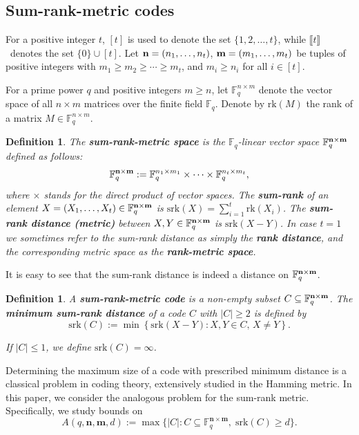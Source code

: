 \documentclass[a4paper]{article}
\newtheorem{definition}[formula]{Definition}
\newcommand{\F}{\mathbb{F}}
\newcommand{\MatnmFq}{\spac}
\newcommand{\bfn}{\mathbf {n}}
\newcommand{\bfm}{\mathbf {m}}
\newcommand{\spac}{\F^{\bfn\times\bfm}_q}
\newcommand{\srk}{\mathrm{srk}}
\newcommand{\rk}{\mathrm{rk}}
\newcommand{\db}[1]{\llbracket #1 \rrbracket}
\begin{document}
\subsection{Sum-rank-metric codes}

For a positive integer $t$, $[t]$ is used to denote the set $\{1,2,\dots,t\}$, while $\db{t}$~denotes the set $\{0\}\cup[t]$. Let ${\bf n}=(n_1,\ldots,n_t)$, ${\bf m}=(m_1,\ldots,m_t)$ be tuples of positive integers 
with $m_1 \geq m_2 \geq \cdots \geq m_t$, 
and $m_i\geq n_i$ for all $i\in [t]$.

For a prime power $q$ and 
positive integers $m\geq n$, 
let $\mathbb{F}_q^{n\times m}$
denote the vector space of all $n\times m$ matrices over the finite field $\mathbb{F}_q$. 
Denote by $\rk(M)$ the rank of a matrix 
$M\in \mathbb{F}_q^{n\times m}$.
 
 
 \begin{definition}\label{def:srk}
The \emph{\textbf{sum-rank-metric space}} is 
the $\mathbb{F}_q$-linear vector space 
$\mathbb{F}_q^{{\bf n}\times {\bf m}}$ defined as follows:
\[
\mathbb{F}_q^{{\bf n}\times {\bf m}}:=
\mathbb{F}_q^{n_1\times m_1}\times \cdots \times
\mathbb{F}_q^{n_t\times m_t},
\]
where $\times$ stands for the direct product of vector spaces.
The \emph{\textbf{sum-rank}} of an element $X=(X_1,\ldots, X_t)\in \mathbb{F}_q^{{\bf n}\times {\bf m}}$ 
is $\srk(X) = \sum_{i=1}^t \rk(X_i)$.
The \emph{\textbf{sum-rank distance (metric)}} between 
$X,Y \in \mathbb{F}_q^{{\bf n}\times {\bf m}}$ is $\srk(X - Y)$.
In case $t=1$ we sometimes refer to the sum-rank distance as simply the \emph{\textbf{rank distance}}, and the corresponding metric space as the \emph{\textbf{rank-metric space}}.
\end{definition}

It is easy to see that the sum-rank distance is indeed a distance on $\mathbb{F}_q^{{\bf n}\times {\bf m}}$.

\begin{definition}
A \emph{\textbf{sum-rank-metric code}} is a non-empty subset $C \subseteq \mathbb{F}_q^{{\bf n}\times {\bf m}}$. 
The \emph{\textbf{minimum sum-rank distance}} of a code $C$ with $|C| \geq 2$ is defined 
by $$\srk(C) := \min\left\{\srk(X-Y)\colon X, Y \in C, \, X \neq Y\right\}.$$

If $|C|\leq 1$, we define $\srk(C)=\infty$.
\end{definition}

Determining the maximum size of a code with prescribed minimum distance is a classical problem in coding theory, extensively studied in the Hamming metric. 
In this paper, we consider the analogous problem for the sum-rank metric. Specifically, we study bounds on
\[
A(q,\bfn,\bfm,d):=\max\{|C|\colon C\subseteq \MatnmFq,\; \srk(C)\ge d\}.
\]
\end{document}
